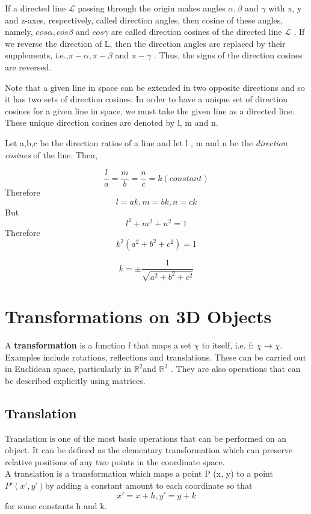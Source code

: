 \documentclass[12pt]{report}
\begin{document}
If a directed line $\mathcal{L}$ passing through the origin makes angles $\alpha, \beta$ and $\gamma$ with x, y and z-axes, respectively, called direction angles, then cosine of these angles, namely, $ cos \alpha, cos \beta $ and $ cos \gamma$ are called direction cosines of the directed line $\mathcal{L}$ . If we reverse the direction of L, then the direction angles are replaced by their supplements, i.e.,$ \pi - \alpha , \pi - \beta$ and $\pi - \gamma$ . Thus, the signs of the direction cosines are reversed. 

\vspace{0.3cm}
Note that a given line in space can be extended in two opposite directions and so it has two sets of direction cosines. In order to have a unique set of direction cosines for a given line in space, we must take the given line as a directed line. These unique direction cosines are denoted by l, m and n. \\
\vspace{0.5cm}

Let a,b,c be the direction ratios of a line and let l , m and n be the  \textit{direction cosines} of the line. Then,

\[ \dfrac{l}{a} = \dfrac{m}{b} = \dfrac{n}{c} = k (constant) \]
Therefore \[ l = ak, m = bk , n = ck \]
But       \[ l^2 + m^2 + n^2 = 1 \]
Therefore \[ k^2 (a^2 + b^2 + c^2) = 1 \]

\[ k = \pm \dfrac{1}{ \sqrt{a^2 + b^2 + c^2} } \]

\section{Transformations on 3D Objects}


A \textbf{transformation} is a function f that maps a set $\chi$ to itself, i.e.   f: $\chi \rightarrow \chi$. Examples include rotations, reflections and translations. These can be carried out in Euclidean space, particularly in $\mathbb{R}^2 $and $\mathbb{R}^3$ . They are also operations that can be described explicitly using matrices.

\subsection{Translation}
Translation is one of the most basic operations that can be performed on an object. It can be defined as the elementary transformation which can preserve relative positions of any two points in the coordinate space. 
\vspace{0.3cm}
\\
A translation is a transformation which maps a point P (x, y) to a point $ P' (x’ , y’) $by adding a constant amount to each coordinate so that 
\[ x' = x + h, y' = y + k \] for some constants h and k.\\
\end{document}
